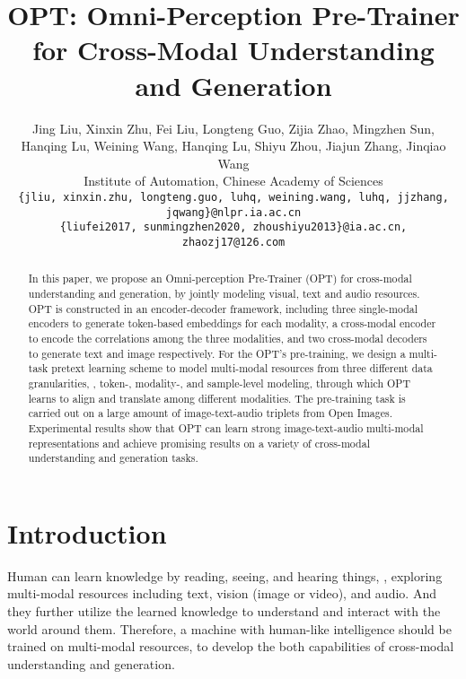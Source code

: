 \documentclass[10pt,twocolumn,letterpaper]{article}
\begin{document}
\title{OPT: Omni-Perception Pre-Trainer for Cross-Modal Understanding and Generation}

\author{Jing Liu, Xinxin Zhu, Fei Liu, Longteng Guo, Zijia Zhao, Mingzhen Sun,   \\ 
Hanqing Lu, Weining Wang, Hanqing Lu, Shiyu Zhou, Jiajun Zhang, Jinqiao Wang  \\
Institute of Automation, Chinese Academy of Sciences \\
{\tt\small \{jliu, xinxin.zhu, longteng.guo, luhq, weining.wang, luhq, jjzhang, jqwang\}@nlpr.ia.ac.cn} \\
{\tt\small \{liufei2017, sunmingzhen2020, zhoushiyu2013\}@ia.ac.cn, zhaozj17@126.com}
}

\maketitle
\ificcvfinal\thispagestyle{empty}\fi

\renewcommand{\thefootnote}{}
\begin{abstract}
In this paper, we propose an Omni-perception Pre-Trainer (OPT) for cross-modal understanding and generation, by jointly modeling visual, text and audio resources. OPT is constructed in an encoder-decoder framework, including three single-modal encoders to generate token-based embeddings for each modality, a cross-modal encoder to encode the correlations among the three modalities, and two cross-modal decoders to generate text and image respectively. For the OPT's pre-training, we design a multi-task pretext learning scheme to model multi-modal resources from three different data granularities, \ie, token-, modality-, and sample-level modeling, through which OPT learns to align and translate among different modalities. The pre-training task is carried out on a large amount of image-text-audio triplets from Open Images. Experimental results show that OPT can learn strong image-text-audio multi-modal representations and achieve promising results on a variety of cross-modal understanding and generation tasks.
\end{abstract}

\section{Introduction}
Human can learn knowledge by reading, seeing, and hearing things, \ie, exploring multi-modal resources including text, vision (image or video), and audio. And they further utilize the learned knowledge to understand and interact with the world around them. Therefore, a machine with human-like intelligence should be trained on multi-modal resources, to develop the both capabilities of cross-modal understanding and generation.
\end{document}
